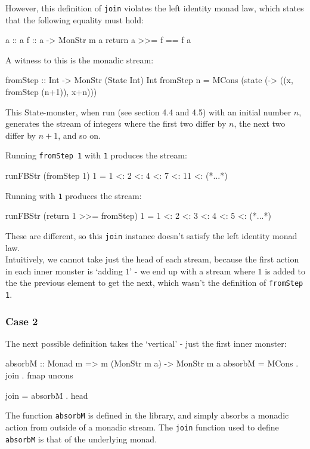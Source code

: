 However, this definition of \verb+join+ violates the left identity monad law, which states that the following equality must hold:
\begin{haskell}
a :: a
f :: a -> MonStr m a
return a >>= f == f a
\end{haskell}

A witness to this is the monadic stream:
\begin{haskell}
fromStep :: Int -> MonStr (State Int) Int
fromStep n = MCons (state (\x -> ((x, fromStep (n+1)), x+n)))
\end{haskell}
This State-monster, when run (see section 4.4 and 4.5) with an initial number $n$, generates the stream of integers where the first two differ by $n$, the next two differ by $n+1$, and so on.

Running \verb+fromStep 1+ with \verb+1+ produces the stream:
\begin{haskell}
runFBStr (fromStep 1) 1 = 1 <: 2 <: 4 <: 7 <: 11 <: (*...*)
\end{haskell}

Running  with \verb+1+ produces the stream:
\begin{haskell}
runFBStr (return 1 >>= fromStep) 1 = 1 <: 2 <: 3 <: 4 <: 5 <: (*...*)
\end{haskell}

These are different, so this \verb+join+ instance doesn't satisfy the left identity monad law. \\

Intuitively, we cannot take just the head of each stream, because the first action in each inner monster is `adding $1$' - we end up with a stream where $1$ is added to the the previous element to get the next, which wasn't the definition of \verb+fromStep 1+.


\subsubsection{Case 2}

The next possible definition takes the `vertical' - just the first inner monster:
\begin{haskell}
absorbM :: Monad m => m (MonStr m a) -> MonStr m a
absorbM = MCons . join . fmap uncons

join = absorbM . head 
\end{haskell}
The function \verb+absorbM+ is defined in the library, and simply absorbs a monadic action from outside of a monadic stream. The \verb+join+ function used to define \verb+absorbM+ is that of the underlying monad.

